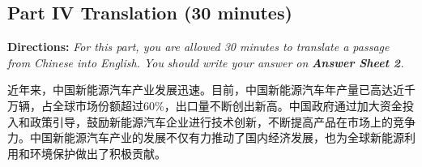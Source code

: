 \documentclass[UTF8,11pt]{ctexart}
\begin{document}
\subsection*{\textbf{Part IV Translation (30 minutes)}}


\textbf{Directions: }\textit{For this part, you are allowed 30 minutes to translate a passage from Chinese into English. You} \textit{should write your answer on }\textbf{\textit{Answer Sheet 2}}\textit{.}


近年来，中国新能源汽车产业发展迅速。目前，中国新能源汽车年产量已高达近千万辆，占全球市场份额超过60\%，出口量不断创出新高。中国政府通过加大资金投入和政策引导，鼓励新能源汽车企业进行技术创新，不断提高产品在市场上的竞争力。中国新能源汽车产业的发展不仅有力推动了国内经济发展，也为全球新能源利用和环境保护做出了积极贡献。
\end{document}
